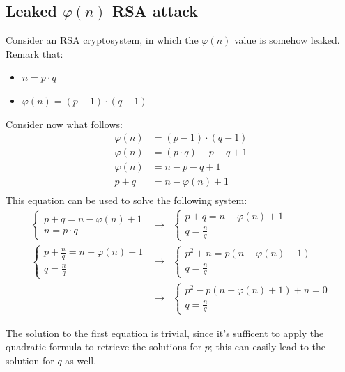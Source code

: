 \subsection{Leaked $\varphi(n)$ RSA attack}
Consider an RSA cryptosystem, in which the $\varphi(n)$ value is somehow leaked. Remark that:
\begin{itemize}
    \item $n = p \cdot q$
    \item $\varphi(n) = (p - 1) \cdot (q - 1)$
\end{itemize}
Consider now what follows:
\begin{align*}
    \varphi(n) &= (p - 1) \cdot (q - 1) \\
    \varphi(n) &= (p \cdot q) - p - q + 1 \\
    \varphi(n) &= n - p - q + 1 \\
    p + q &= n - \varphi(n) + 1 \\
\end{align*}
This equation can be used to solve the following system:
\begin{align*}
    \begin{cases}
        p + q = n - \varphi(n) + 1\\
        n = p \cdot q
    \end{cases}& \rightarrow &
    \begin{cases}
        p + q = n - \varphi(n) + 1\\
        q = \frac{n}{q}
    \end{cases}\\
    \begin{cases}
        p + \frac{n}{q} = n - \varphi(n) + 1\\
        q = \frac{n}{q}
    \end{cases}& \rightarrow &
    \begin{cases}
        p^{2} + n = p(n - \varphi(n) + 1)\\
        q = \frac{n}{q}
    \end{cases}\\
    & \rightarrow &
    \begin{cases}
        p^{2} - p(n - \varphi(n) + 1) + n = 0\\
        q = \frac{n}{q}
    \end{cases}
\end{align*}

The solution to the first equation is trivial, since it's sufficent to apply the quadratic formula to retrieve the solutions for $p$; this can easily lead to the solution for $q$ as well.

